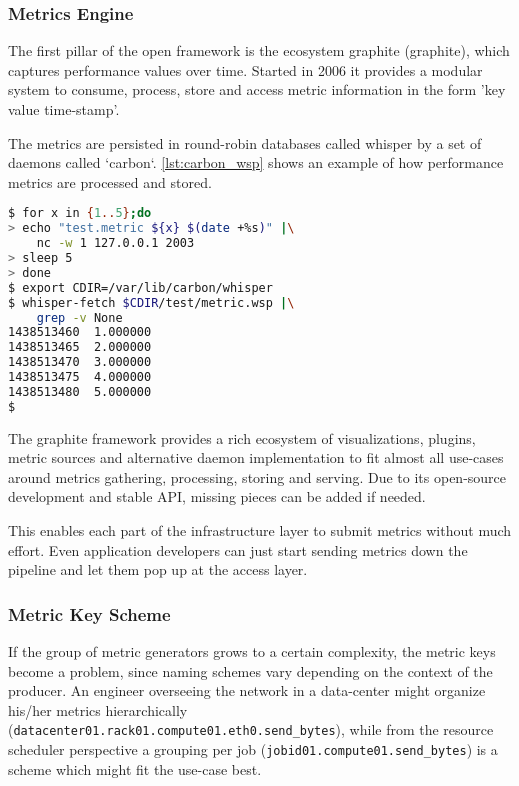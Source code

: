 \subsubsection{Metrics Engine}
\label{metricsengine}
The first pillar of the open framework is the ecosystem \gls{graphite} (\glsdesc{graphite}), which captures performance values over time. 
Started in 2006 it provides a modular system to consume, process, store and access metric information in the form 'key value time-stamp'.

The metrics are persisted in round-robin databases called whisper by a set of daemons called `carbon`.
\autoref{lst:carbon_wsp} shows an example of how performance metrics are processed and stored.

\begin{lstlisting}[language=bash,
    caption={Sending and receiving metrics using carbon in combination with a whisper file back-end.},
    label={lst:carbon_wsp}]
$ for x in {1..5};do
> echo "test.metric ${x} $(date +%s)" |\
    nc -w 1 127.0.0.1 2003
> sleep 5
> done
$ export CDIR=/var/lib/carbon/whisper
$ whisper-fetch $CDIR/test/metric.wsp |\
    grep -v None
1438513460	1.000000
1438513465	2.000000
1438513470	3.000000
1438513475	4.000000
1438513480	5.000000
$
\end{lstlisting}

The \gls{graphite} framework provides a rich ecosystem of visualizations, plugins, metric sources and alternative daemon implementation to fit almost
all use-cases around metrics gathering, processing, storing and serving. Due to its open-source development and stable API, missing pieces
can be added if needed.

This enables each part of the infrastructure layer to submit metrics without much effort. Even application developers can just start sending metrics down the pipeline and
let them pop up at the access layer.

\subsubsection{Metric Key Scheme}

If the group of metric generators grows to a certain complexity, the metric keys become a problem, since naming schemes vary depending on the context of
the producer. An engineer overseeing the network in a data-center might organize his/her metrics hierarchically (\lstinline{datacenter01.rack01.compute01.eth0.send_bytes}), while from the
resource scheduler perspective a grouping per job (\lstinline{jobid01.compute01.send_bytes}) is a scheme which might fit the use-case best.

